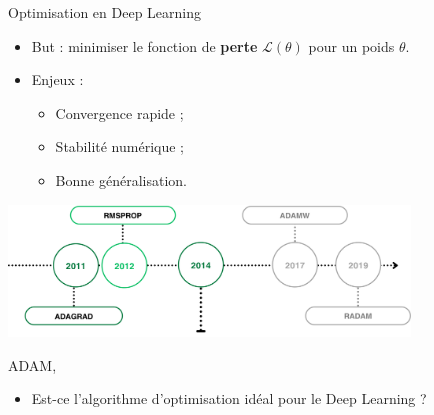\documentclass{beamer}
\begin{document}
\begin{frame}{Optimisation en Deep Learning}

  \begin{itemize}
    \item But : minimiser le fonction de \textbf{perte} $\mathcal{L}(\theta)$ pour un poids $\theta$.
    \medskip
    \item Enjeux : 
    \begin{itemize}
      \item Convergence rapide ;
      \item Stabilité numérique ;
      \item Bonne généralisation.
    \end{itemize}
  \end{itemize}
  
  \begin{center}
    \includegraphics[width=0.8\textwidth]{frise2.png}
  \end{center}

  \begin{center}
    ADAM, \cite{kingma2014}
  \end{center}
  \begin{itemize}
    \item Est-ce l’algorithme d’optimisation idéal pour le Deep Learning ?
  \end{itemize}

\end{frame}

\end{document}
